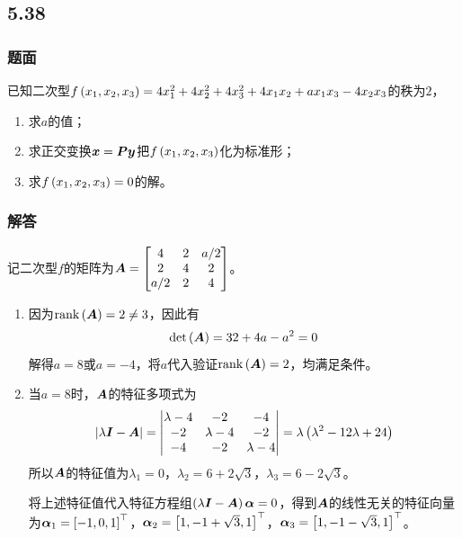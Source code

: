 \documentclass{beamer}
\begin{document}
\subsection*{5.38}
\begin{frame}
    \frametitle{题面}
    已知二次型\(f\left( x_1,x_2,x_3 \right)=4x_1^2+4x_2^2+4x_3^2+4x_1x_2+ax_1x_3-4x_2x_3\)的秩为\(2\)，
    \begin{enumerate}
        \item 求\(a\)的值；
        \item 求正交变换\(\boldsymbol{x}=\boldsymbol{P}\boldsymbol{y}\)把\(f\left( x_1,x_2,x_3 \right)\)化为标准形；
        \item 求\(f\left( x_1,x_2,x_3 \right)=0\)的解。
    \end{enumerate}
\end{frame}

\begin{frame}[allowframebreaks]
    \frametitle{解答}
    记二次型\(f\)的矩阵为\(\boldsymbol{A}=\begin{bmatrix}4&2&a/2\\2&4&2\\a/2&2&4\end{bmatrix}\)。
    \begin{enumerate}
        \item {
              因为\(\mathrm{rank}\left( \boldsymbol{A} \right)=2\neq3\)，因此有
              \begin{equation*}
                  \mathrm{det}\left( \boldsymbol{A} \right)=32+4a-a^2=0
              \end{equation*}
              解得\(a=8\)或\(a=-4\)，将\(a\)代入验证\(\mathrm{rank}\left( \boldsymbol{A} \right)=2\)，均满足条件。
              }
        \item {
              当\(a=8\)时，\(\boldsymbol{A}\)的特征多项式为
              \begin{equation*}
                  \left|\lambda\boldsymbol{I}-\boldsymbol{A} \right|=\begin{vmatrix}\lambda-4&-2&-4\\-2&\lambda-4&-2\\-4&-2&\lambda-4\end{vmatrix}=\lambda\left( \lambda^2-12\lambda+24 \right)
              \end{equation*}
              所以\(\boldsymbol{A}\)的特征值为\(\lambda_1=0\)，\(\lambda_2=6+2\sqrt{3}\)，\(\lambda_3=6-2\sqrt{3}\)。

              将上述特征值代入特征方程组\(\left( \lambda\boldsymbol{I}-\boldsymbol{A} \right)\boldsymbol{\alpha}=0\)，得到\(\boldsymbol{A}\)的线性无关的特征向量为\(\boldsymbol{\alpha}_1=\left[ -1,0,1 \right]^\top\)，\(\boldsymbol{\alpha}_2=\left[ 1,-1+\sqrt{3},1 \right]^\top\)，\(\boldsymbol{\alpha}_3=\left[ 1,-1-\sqrt{3},1 \right]^\top\)。

}
\end{enumerate}
\end{frame}
\end{document}
